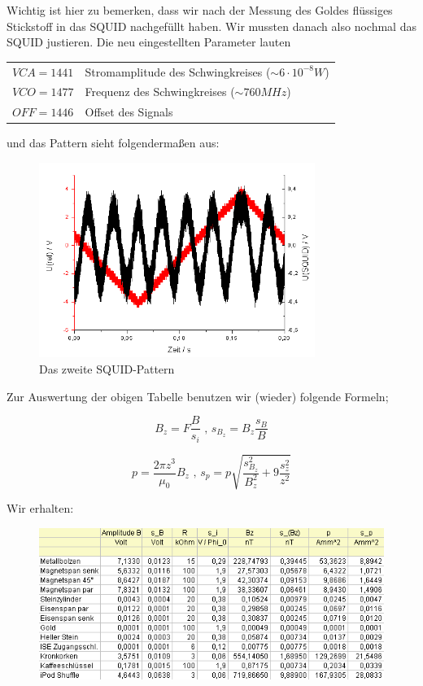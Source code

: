 Wichtig ist hier zu bemerken, dass wir nach der Messung des Goldes flüssiges Stickstoff in das SQUID nachgefüllt haben. Wir mussten danach also nochmal das SQUID justieren. Die neu eingestellten Parameter lauten

\begin{center}
\begin{tabular}[H]{l l}
	$VCA = 1441$ & Stromamplitude des Schwingkreises ($\sim 6\cdot 10^{-8} W$)\\
	$VCO = 1477$ & Frequenz des Schwingkreises ($\sim 760 MHz$)\\
	$OFF = 1446$  & Offset des Signals
\end{tabular}
\end{center}

und das Pattern sieht folgendermaßen aus:

\begin{figure}[H]
	\centering \includegraphics[width = 0.8\textwidth]{Bilder/Pattern2.png}
	\caption{Das zweite SQUID-Pattern}
\end{figure}


Zur Auswertung der obigen Tabelle benutzen wir (wieder) folgende Formeln;

$$ B_z = F\frac{B}{s_i} \text{ \ \ , \ \ } s_{B_z} = B_z\frac{s_B}{B}$$

$$ p = \frac{2\pi z^3}{\mu_0}B_z \text{ \ \ , \ \ } s_p = p\sqrt{\frac{s_{B_z}^2}{B_z^2} + 9\frac{s_z^2}{z^2}} $$

Wir erhalten:

\begin{figure}[H]
	\centering \includegraphics[width=\textwidth]{Bilder/Tab-Proben.png}
\end{figure}

